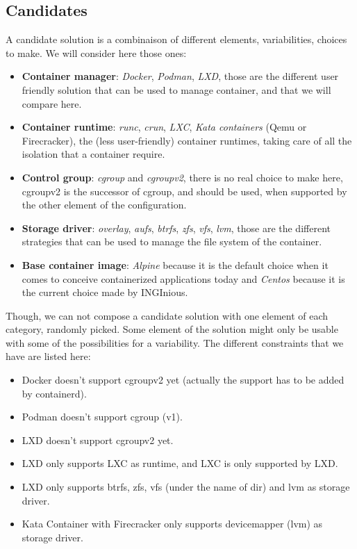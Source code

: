 \subsection{Candidates}\label{subs:candidates}
A candidate solution is a combinaison of different elements, variabilities, choices to make.  We will consider here those ones:
\begin{itemize}
  \renewcommand\labelitemi{--}
  \item \textbf{Container manager}: \textit{Docker}, \textit{Podman}, \textit{LXD}, those are the different user friendly solution that can be used to manage container, and that we will compare here.
  \item \textbf{Container runtime}: \textit{runc}, \textit{crun}, \textit{LXC}, \textit{Kata containers} (Qemu or Firecracker), the (less user-friendly) container runtimes, taking care of all the isolation that a container require.
  \item \textbf{Control group}: \textit{cgroup} and \textit{cgroupv2}, there is no real choice to make here, cgroupv2 is the successor of cgroup, and should be used, when supported by the other element of the configuration.
  \item \textbf{Storage driver}: \textit{overlay}, \textit{aufs}, \textit{btrfs}, \textit{zfs}, \textit{vfs}, \textit{lvm}, those are the different strategies that can be used to manage the file system of the container.
  \item \textbf{Base container image}: \textit{Alpine} because it is the default choice when it comes to conceive containerized applications today and \textit{Centos} because it is the current choice made by INGInious.
\end{itemize}

Though, we can not compose a candidate solution with one element of each category, randomly picked.  Some element of the solution might only be usable with some of the possibilities for a variability.  The different constraints that we have are listed here:
\begin{itemize}
  \renewcommand\labelitemi{--}
  \item Docker doesn't support cgroupv2 yet (actually the support has to be added by containerd).
  \item Podman doesn't support cgroup (v1).
  \item LXD doesn't support cgroupv2 yet.
  \item LXD only supports LXC as runtime, and LXC is only supported by LXD.
  \item LXD only supports btrfs, zfs, vfs (under the name of dir) and lvm as storage driver.
  \item Kata Container with Firecracker only supports devicemapper (lvm) as storage driver.
\end{itemize}


